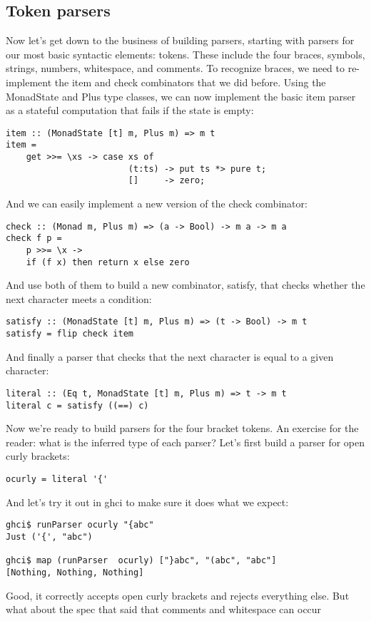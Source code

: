 \documentclass{tmr}
\begin{document}
\subsection{Token parsers}
Now let's get down to the business of building parsers, starting with parsers
for our most basic syntactic elements:  tokens.
These include the four braces, symbols, strings, numbers, whitespace, and comments.
To recognize braces, we need to re-implement the item and check combinators that
we did before.  Using the MonadState and Plus type classes, 
we can now implement the basic item parser as a stateful
computation that fails if the state is empty:
\begin{verbatim}
item :: (MonadState [t] m, Plus m) => m t
item =
    get >>= \xs -> case xs of
                        (t:ts) -> put ts *> pure t;
                        []     -> zero;
\end{verbatim}
And we can easily implement a new version of the check combinator:
\begin{verbatim}
check :: (Monad m, Plus m) => (a -> Bool) -> m a -> m a
check f p =
    p >>= \x ->
    if (f x) then return x else zero
\end{verbatim}
And use both of them to build a new combinator, satisfy, that checks whether
the next character meets a condition:
\begin{verbatim}
satisfy :: (MonadState [t] m, Plus m) => (t -> Bool) -> m t
satisfy = flip check item
\end{verbatim}
And finally a parser that checks that the next character is equal to a
given character:
\begin{verbatim}
literal :: (Eq t, MonadState [t] m, Plus m) => t -> m t
literal c = satisfy ((==) c)
\end{verbatim}
Now we're ready to build parsers for the four bracket tokens.  
An exercise for the reader:  what is the inferred type of each parser?
Let's first build a parser for open curly brackets:
\begin{verbatim}
ocurly = literal '{'
\end{verbatim}
And let's try it out in ghci to make sure it does what we expect:
\begin{verbatim}
ghci$ runParser ocurly "{abc"
Just ('{', "abc")

ghci$ map (runParser  ocurly) ["}abc", "(abc", "abc"]
[Nothing, Nothing, Nothing]
\end{verbatim}
Good, it correctly accepts open curly brackets and rejects everything else.
But what about the spec that said that comments and whitespace can occur 
\end{document}
